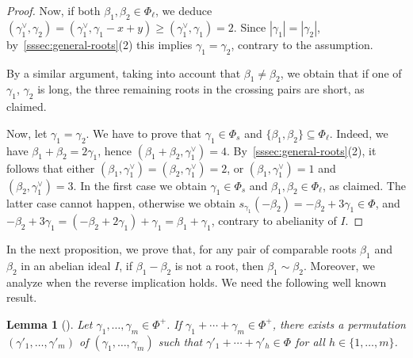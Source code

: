 \documentclass[10pt]{amsart}
\newtheorem{lem}[thm]{Lemma}
\theoremstyle{definition}
\theoremstyle{remark}
\newcommand\be{\beta}
\newcommand\ga{\gamma}
\begin{document}
\begin{proof}
\par
Now, if both $\be_1, \be_2\in \Phi_\ell$, we deduce $(\ga_1^\vee, \ga_2)=(\ga_1^\vee, \ga_1-x+y)\geq (\ga_1^\vee, \ga_1)=2$. 
Since $|\ga_1|=|\ga_2|$,  by~\ref{sssec:general-roots}(2) this implies $\ga_1=\ga_2$, contrary to the assumption.

\par
By a similar argument, taking into account that $\be_1\neq \be_2$, we obtain that if one of $\ga_1$, $\ga_2$ is long, the three remaining roots in the crossing pairs are short, as claimed.

\par 
Now, let $\ga_1=\ga_2$. 
We have to prove that $\ga_1\in \Phi_s$ and $\{\be_1, \be_2\}\subseteq\Phi_\ell$.
Indeed, we have $\be_1+\be_2=2\ga_1$, hence $(\be_1+\be_2, \ga_1^\vee)=4$. 
By~\ref{sssec:general-roots}(2), it follows that either $(\be_1,\ga_1^\vee)=(\be_2,\ga_1^\vee)=2$,
or $(\be_1,\ga_1^\vee)=1$ and $(\be_2,\ga_1^\vee)=3$. 
In the first case we obtain $\ga_1\in \Phi_s$ and $\be_1, \be_2\in \Phi_\ell$, as claimed.
The latter case cannot happen, otherwise we obtain $s_{\ga_1}(-\be_2)=-\be_2+3\ga_1\in \Phi$, and $-\be_2+3\ga_1=(-\be_2+2\ga_1)+\ga_1=\be_1+\ga_1$, contrary to abelianity of $I$.
\end{proof}

In the next proposition, we prove that, for any pair of comparable roots $\be_1$ and $\be_2$ in an abelian ideal $I$, if $\be_1-\be_2$ is  not a root, then $\be_1\sim \be_2$. 
Moreover, we analyze when the reverse implication holds. 
We need the following well known result. 

\begin{lem}[{\cite[Ch.~VI, \S~1.9, Proposition~19]{Bou}}]\label{lem:somme-bou}
Let $\ga_1,\dots, \ga_m\in \Phi^+$. 
If  $\ga_1+\cdots+\ga_m\in \Phi^+$, 
there exists a permutation $(\ga'_1, \dots, \ga'_m)$ of $(\ga_1, \dots,\ga_m)$ such that $\ga'_{1}+\cdots+\ga'_{h}\in \Phi$ for all $h\in\{1, \dots, m\}$. 
\end{lem}
\end{document}
